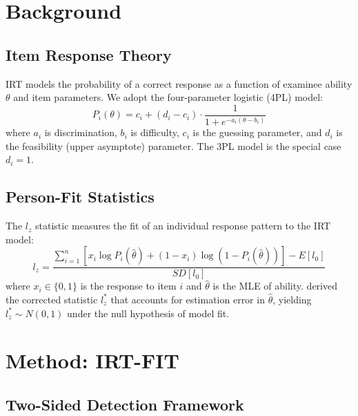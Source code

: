 \documentclass[11pt,a4paper]{article}
\begin{document}
\section{Background}
\label{sec:background}

\subsection{Item Response Theory}

IRT models the probability of a correct response as a function of examinee ability $\theta$ and item parameters. We adopt the four-parameter logistic (4PL) model:
\begin{equation}
P_i(\theta) = c_i + (d_i - c_i) \cdot \frac{1}{1 + e^{-a_i(\theta - b_i)}}
\label{eq:4pl}
\end{equation}
where $a_i$ is discrimination, $b_i$ is difficulty, $c_i$ is the guessing parameter, and $d_i$ is the feasibility (upper asymptote) parameter. The 3PL model is the special case $d_i=1$.

\subsection{Person-Fit Statistics}

The $l_z$ statistic \citep{drasgow1985appropriateness} measures the fit of an individual response pattern to the IRT model:
\begin{equation}
l_z = \frac{\sum_{i=1}^{n} \left[ x_i \log P_i(\hat{\theta}) + (1-x_i) \log(1-P_i(\hat{\theta})) \right] - E[l_0]}{SD[l_0]}
\end{equation}
where $x_i \in \{0,1\}$ is the response to item $i$ and $\hat{\theta}$ is the MLE of ability. \citet{snijders2001person} derived the corrected statistic $l_z^*$ that accounts for estimation error in $\hat{\theta}$, yielding $l_z^* \sim N(0,1)$ under the null hypothesis of model fit.

\section{Method: IRT-FIT}
\label{sec:method}

\subsection{Two-Sided Detection Framework}
\end{document}
